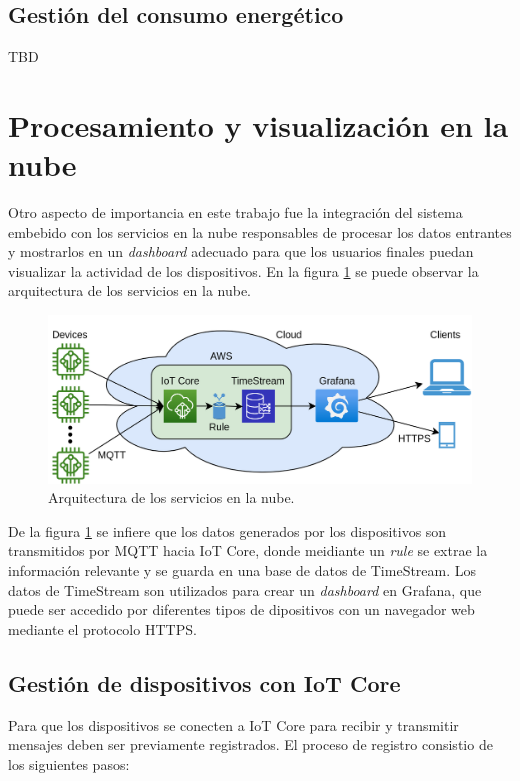 \subsection{Gestión del consumo energético}
TBD
\section{Procesamiento y visualización en la nube}
Otro aspecto de importancia en este trabajo fue la integración del sistema embebido con los servicios en la nube responsables de procesar los datos entrantes y mostrarlos en un \textit{dashboard} adecuado para que los usuarios finales puedan visualizar la actividad de los dispositivos. En la figura \ref{fig:cc_diagram} se puede observar la arquitectura de los servicios en la nube.

\begin{figure}[h]
	\centering
	\includegraphics[scale=0.22]{./Figures/cc_diagram.png}
	\caption{Arquitectura de los servicios en la nube.}
	\label{fig:cc_diagram}
\end{figure}

De la figura \ref{fig:cc_diagram} se infiere que los datos generados por los dispositivos son transmitidos por MQTT hacia IoT Core, donde meidiante un \textit{rule} se extrae la información relevante y se guarda en una base de datos de TimeStream. Los datos de TimeStream son utilizados para crear un \textit{dashboard} en Grafana, que puede ser accedido por diferentes tipos de dipositivos con un navegador web mediante el protocolo HTTPS.

\subsection{Gestión de dispositivos con IoT Core}
\label{subsection3_3_1}
Para que los dispositivos se conecten a IoT Core para recibir y transmitir mensajes deben ser previamente registrados. El proceso de registro consistio de los siguientes pasos:

